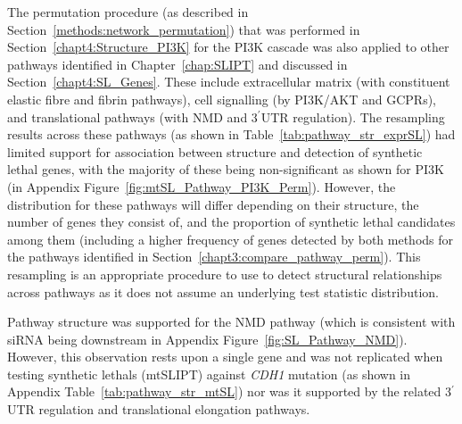 The permutation procedure (as described in Section~\ref{methods:network_permutation}) that was performed in Section~\ref{chapt4:Structure_PI3K} for the \gls{PI3K} cascade was also applied to other pathways identified in Chapter~\ref{chap:SLIPT} and discussed in Section~\ref{chapt4:SL_Genes}. These include extracellular matrix (with constituent elastic fibre and fibrin pathways), cell signalling (by PI3K/AKT and GCPRs), and translational pathways (with \gls{NMD} and 3$^\prime$\gls{UTR} regulation). The resampling results across these pathways (as shown in Table~\ref{tab:pathway_str_exprSL}) had limited support for association between  structure and detection of \gls{synthetic lethal} genes, with the majority of these being non-significant as shown for \gls{PI3K} (in Appendix Figure~\ref{fig:mtSL_Pathway_PI3K_Perm}). However, the distribution for these pathways will differ depending on their structure, the number of genes they consist of, and the proportion of \gls{synthetic lethal} candidates among them (including a higher frequency of genes detected by both methods for the pathways identified in Section~\ref{chapt3:compare_pathway_perm}). This resampling is an appropriate procedure to use to detect structural relationships across pathways as it does not assume an underlying test statistic distribution.

Pathway structure was supported for the \gls{NMD} pathway (which is consistent with \gls{siRNA} being downstream in Appendix Figure~\ref{fig:SL_Pathway_NMD}). However, this observation rests upon a single gene and was not replicated when testing \glspl{synthetic lethal} (\acrshort{mtSLIPT}) against \textit{CDH1} \gls{mutation} (as shown in Appendix Table~\ref{tab:pathway_str_mtSL}) nor was it supported by the related 3$^\prime$\gls{UTR} regulation and translational elongation pathways.

